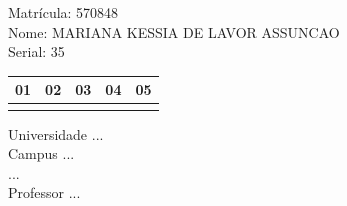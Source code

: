 \documentclass[10pt,a4paper,twocolumn]{report}
\begin{document}
Matrícula: 570848\\ Nome: MARIANA KESSIA DE LAVOR ASSUNCAO \\ Serial: 35\\
\begin{tabular}{|l|l|l|l|l|}\hline
01  &02  &03  &04  &05 \\ \hline 
 & & & & \\ \hline 
\end{tabular}
 \cleardoublepage 

\begin{flushleft}
Universidade ...\\
Campus ...\\
...\\
Professor ...\\
\end{flushleft}
\end{document}
